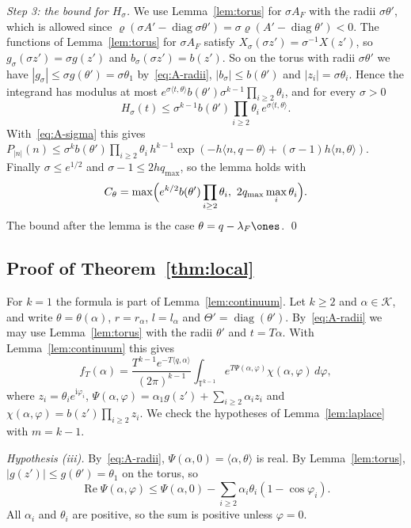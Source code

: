 \emph{Step 3: the bound for $H_\sigma$.} We use Lemma~\ref{lem:torus} for
$\sigma A_F$ with the radii $\sigma\theta'$, which is allowed since
$\varrho(\sigma A'-\operatorname{diag}\sigma\theta')
=\sigma\varrho(A'-\operatorname{diag}\theta')<0$. The functions of
Lemma~\ref{lem:torus} for $\sigma A_F$ satisfy
$X_\sigma(\sigma z')=\sigma^{-1}X(z')$, so $g_\sigma(\sigma z')=\sigma g(z')$
and $b_\sigma(\sigma z')=b(z')$. So on the torus with radii $\sigma\theta'$
we have $|g_\sigma|\le\sigma g(\theta')=\sigma\theta_1$
by~\eqref{eq:A-radii}, $|b_\sigma|\le b(\theta')$ and
$|z_i|=\sigma\theta_i$. Hence the integrand has modulus at most
$e^{\sigma\langle t,\theta\rangle}b(\theta')\sigma^{k-1}
\prod_{i\ge2}\theta_i$, and for every $\sigma>0$
\begin{equation}\label{eq:A-Hsigma}
H_\sigma(t)\le\sigma^{k-1}b(\theta')\prod_{i\ge2}\theta_i\,
e^{\sigma\langle t,\theta\rangle}.
\end{equation}
With~\eqref{eq:A-sigma} this gives
$P_{|n|}(n)\le\sigma^kb(\theta')\prod_{i\ge2}\theta_i\,h^{k-1}
\exp(-h\langle n,q-\theta\rangle+(\sigma-1)h\langle n,\theta\rangle)$.
Finally $\sigma\le e^{1/2}$ and $\sigma-1\le2hq_{\max}$, so the lemma holds
with
\[
C_\theta=\max\Bigl(e^{k/2}b(\theta')\prod_{i\ge2}\theta_i,\ 2q_{\max}\max_i\theta_i\Bigr).
\]
The bound after the lemma is the case
$\theta=q-\lambda_F\ones$. \qed

\subsection{Proof of \texorpdfstring{Theorem~\ref{thm:local}}{the local law}}

For $k=1$ the formula is part of Lemma~\ref{lem:continuum}. Let $k\ge2$ and
$\alpha\in\mathcal K$, and write $\theta=\theta(\alpha)$, $r=r_\alpha$,
$l=l_\alpha$ and $\Theta'=\operatorname{diag}(\theta')$. By~\eqref{eq:A-radii}
we may use Lemma~\ref{lem:torus} with the radii $\theta'$ and $t=T\alpha$.
With Lemma~\ref{lem:continuum} this gives
\begin{equation}\label{eq:A-fT}
f_T(\alpha)=\frac{T^{k-1}e^{-T\langle q,\alpha\rangle}}{(2\pi)^{k-1}}
\int_{\mathbb T^{k-1}}e^{T\Psi(\alpha,\varphi)}\chi(\alpha,\varphi)\,d\varphi,
\end{equation}
where $z_i=\theta_ie^{\mathrm i\varphi_i}$,
$\Psi(\alpha,\varphi)=\alpha_1g(z')+\sum_{i\ge2}\alpha_iz_i$ and
$\chi(\alpha,\varphi)=b(z')\prod_{i\ge2}z_i$. We check the hypotheses of
Lemma~\ref{lem:laplace} with $m=k-1$.

\emph{Hypothesis \textup{(iii)}.} By~\eqref{eq:A-radii},
$\Psi(\alpha,0)=\langle\alpha,\theta\rangle$ is real. By
Lemma~\ref{lem:torus}, $|g(z')|\le g(\theta')=\theta_1$ on the
torus, so
\[
\operatorname{Re}\Psi(\alpha,\varphi)\le\Psi(\alpha,0)
-\sum_{i\ge2}\alpha_i\theta_i(1-\cos\varphi_i).
\]
All $\alpha_i$ and $\theta_i$ are positive, so the sum is positive unless
$\varphi=0$.

